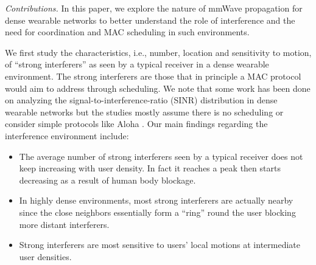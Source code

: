 \documentclass[10pt, conference, letterpaper]{IEEEtran}
\begin{document}
\emph{Contributions.}
In this paper, we explore the nature of mmWave propagation for dense wearable networks to better understand the role of interference and the need for coordination and MAC scheduling in such environments. 

We first study the characteristics, i.e., number, location and sensitivity to motion, of ``strong interferers'' as seen by a typical receiver in a dense wearable environment. 
The strong interferers are those that in principle a MAC protocol would aim to address through scheduling. 
We note that some work has been done on analyzing the signal-to-interference-ratio (SINR) distribution in dense wearable networks but the studies mostly assume there is no scheduling or consider simple protocols like Aloha \cite{interferencefinitesized}\cite{enclosedmmwave}.
Our main findings regarding the interference environment include: 
\begin{itemize}
	\item The average number of strong interferers seen by a typical receiver does not keep increasing with user density. 
	In fact it reaches a peak then starts decreasing as a result of human body blockage. 
	\item In highly dense environments, most strong interferers are actually nearby since the close neighbors essentially form a ``ring'' round the user blocking more distant interferers. 
	\item Strong interferers are most sensitive to users' local motions at intermediate user densities. 
\end{itemize}
\end{document}
